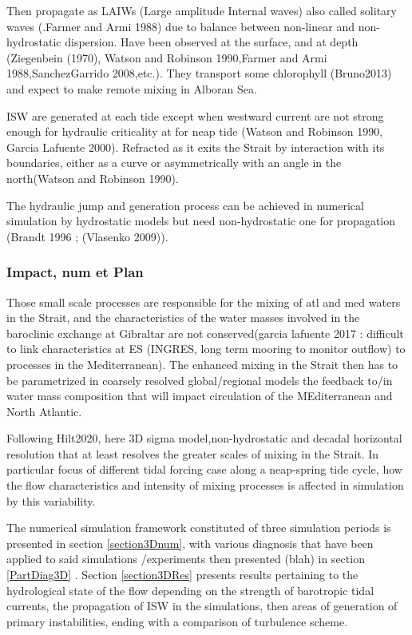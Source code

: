 Then propagate as LAIWs (Large amplitude Internal waves) also called solitary waves (.Farmer and Armi 1988) due to balance between non-linear and non-hydrostatic dispersion. Have been observed at the surface, and at depth (Ziegenbein (1970), Watson and Robinson 1990,Farmer and Armi 1988,SanchezGarrido 2008,etc.). They transport some chlorophyll (Bruno2013) and expect to make remote mixing in Alboran Sea.

ISW are generated at each tide except when westward current are not strong enough for hydraulic criticality at for neap tide (Watson and Robinson 1990, Garcia Lafuente 2000). Refracted as it exits the Strait by interaction with its boundaries, either as a curve or asymmetrically with an angle in the north(Watson and Robinson 1990).

The hydraulic jump and generation process can be achieved in numerical simulation by hydrostatic models but need non-hydrostatic one for propagation (Brandt 1996 ; (Vlasenko 2009)).



\subsubsection{Impact, num et Plan}

Those small scale processes are responsible for the mixing of atl and med waters in the Strait, and the characteristics of the water masses involved in the baroclinic exchange at Gibraltar are not conserved(garcia lafuente 2017 : difficult to link characteristics at ES (INGRES, long term mooring to monitor outflow) to processes in the Mediterranean). The enhanced mixing in the Strait then has to be parametrized in coarsely resolved global/regional models the feedback to/in water mass composition that will impact circulation of the MEditerranean and North Atlantic. 


Following Hilt2020, here 3D sigma model,non-hydrostatic and decadal horizontal resolution that at least resolves the greater scales of mixing in the Strait. In particular focus of different tidal forcing case along a neap-spring tide cycle, how the flow characteristics and intensity of mixing processes is affected in simulation by this variability.


The numerical simulation framework constituted of three simulation periods is presented in section \ref{section3Dnum}, with various diagnosis that have been applied to said simulations /experiments then presented (blah) in section \ref{PartDiag3D} . Section \ref{section3DRes} presents results pertaining to the hydrological state of the flow depending on the strength of barotropic tidal currents, the propagation of ISW in the simulations, then areas of generation of primary instabilities, ending with a comparison of turbulence scheme.






